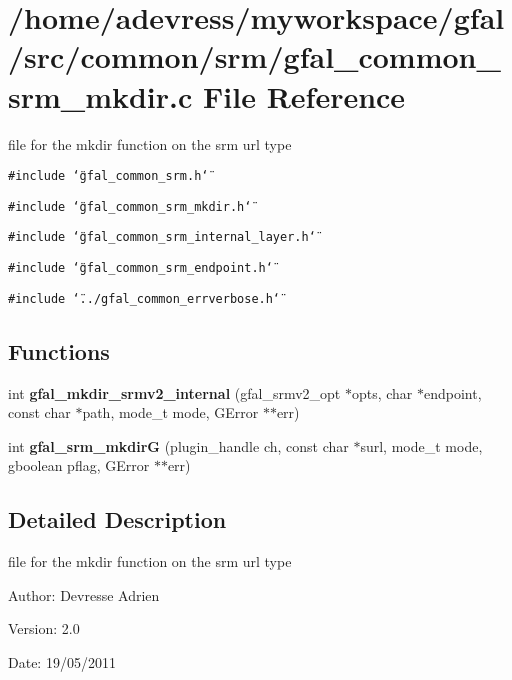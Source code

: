 \section{/home/adevress/myworkspace/gfal/src/common/srm/gfal\_\-common\_\-srm\_\-mkdir.c File Reference}
\label{gfal__common__srm__mkdir_8c}
file for the mkdir function on the srm url type 

{\tt \#include \char`\"{}gfal\_\-common\_\-srm.h\char`\"{}}\par
{\tt \#include \char`\"{}gfal\_\-common\_\-srm\_\-mkdir.h\char`\"{}}\par
{\tt \#include \char`\"{}gfal\_\-common\_\-srm\_\-internal\_\-layer.h\char`\"{}}\par
{\tt \#include \char`\"{}gfal\_\-common\_\-srm\_\-endpoint.h\char`\"{}}\par
{\tt \#include \char`\"{}../gfal\_\-common\_\-errverbose.h\char`\"{}}\par
\subsection*{Functions}
\begin{CompactItemize}
\item 
int \textbf{gfal\_\-mkdir\_\-srmv2\_\-internal} (gfal\_\-srmv2\_\-opt $\ast$opts, char $\ast$endpoint, const char $\ast$path, mode\_\-t mode, GError $\ast$$\ast$err)\label{gfal__common__srm__mkdir_8c_00ce847803c5ae9d125fd974c9d66e03}

\item 
int \textbf{gfal\_\-srm\_\-mkdir\-G} (plugin\_\-handle ch, const char $\ast$surl, mode\_\-t mode, gboolean pflag, GError $\ast$$\ast$err)\label{gfal__common__srm__mkdir_8c_1bbb17b6d27e6e2d83efb27d524154ba}

\end{CompactItemize}


\subsection{Detailed Description}
file for the mkdir function on the srm url type 

\begin{Desc}
\item[Author:]Devresse Adrien \end{Desc}
\begin{Desc}
\item[Version:]2.0 \end{Desc}
\begin{Desc}
\item[Date:]19/05/2011 \end{Desc}

